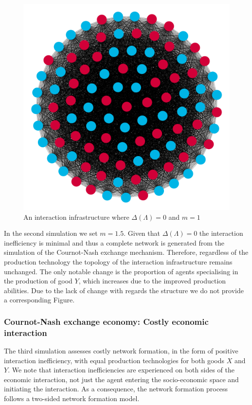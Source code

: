 \begin{figure}[t]
\centering
\includegraphics[scale=0.22]{Images/Sim1C.png}
\caption{An interaction infrastructure where $\Delta(\Lambda)=0$ and $m=1$}
\label{Sim5}
\end{figure}

In the second simulation we set $m = 1.5$. Given that $\Delta(\Lambda) = 0$ the interaction inefficiency is minimal and thus a complete network is generated from the simulation of the Cournot-Nash exchange mechanism. Therefore, regardless of the production technology the topology of the interaction infrastructure remains unchanged. The only notable change is the proportion of agents specialising in the production of good $Y$, which increases due to the improved production abilities. Due to the lack of change with regards the structure we do not provide a corresponding Figure.

\subsubsection{Cournot-Nash exchange economy: Costly economic interaction}

The third simulation assesses costly network formation, in the form of positive interaction inefficiency, with equal production technologies for both goods $X$ and $Y$. We note that interaction inefficiencies are experienced on both sides of the economic interaction, not just the agent entering the socio-economic space and initiating the interaction. As a consequence, the network formation process follows a two-sided network formation model.

